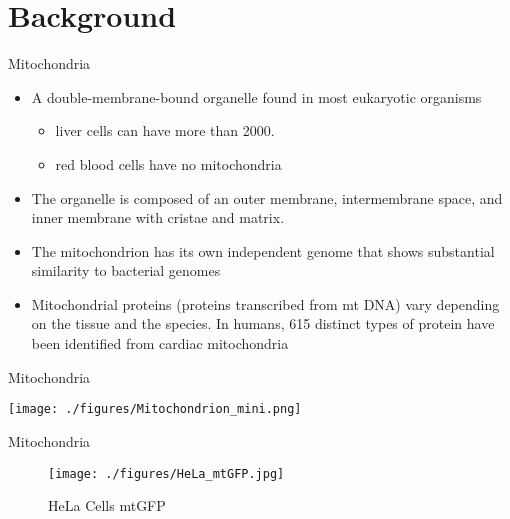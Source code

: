 \documentclass[presentation, smaller]{beamer}
\begin{document}
\section{Background}
\label{sec:org6b9bf83}
\begin{frame}[label={sec:org3ddc551}]{Mitochondria}
\begin{itemize}
\item A double-membrane-bound organelle found in most eukaryotic organisms
\begin{itemize}
\item liver cells can have more than 2000.
\item red blood cells have no mitochondria
\end{itemize}

\item The organelle is composed of an outer membrane, intermembrane
space, and inner membrane with cristae and matrix.

\item The mitochondrion has its own independent genome that shows
substantial similarity to bacterial genomes

\item Mitochondrial proteins (proteins transcribed from mt DNA)
vary depending on the tissue and the species. In humans, 615
distinct types of protein have been identified from cardiac
mitochondria
\end{itemize}
\end{frame}

\begin{frame}[label={sec:org43d57de}]{Mitochondria}
\begin{center}
\texttt{[image: ./figures/Mitochondrion\_mini.png]}
\end{center}
\end{frame}

\begin{frame}[label={sec:orgc563b3a}]{Mitochondria}
\begin{figure}[htbp]
\centering
\texttt{[image: ./figures/HeLa\_mtGFP.jpg]}
\caption[hela]{\label{fig:org9b34730}
HeLa Cells mtGFP}
\end{figure}
\end{frame}
\end{document}
